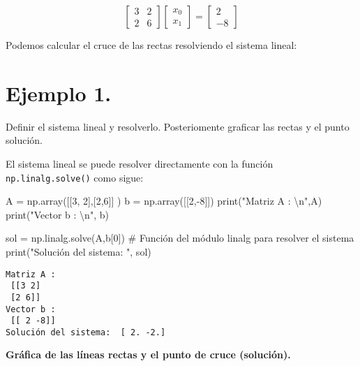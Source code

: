 \documentclass[
  letterpaper,
  DIV=11,
  numbers=noendperiod]{scrreprt}
\newenvironment{Shaded}{\begin{snugshade}}{\end{snugshade}}
\newcommand{\BuiltInTok}[1]{\textcolor[rgb]{0.00,0.23,0.31}{#1}}
\newcommand{\CharTok}[1]{\textcolor[rgb]{0.13,0.47,0.30}{#1}}
\newcommand{\CommentTok}[1]{\textcolor[rgb]{0.37,0.37,0.37}{#1}}
\newcommand{\DecValTok}[1]{\textcolor[rgb]{0.68,0.00,0.00}{#1}}
\newcommand{\NormalTok}[1]{\textcolor[rgb]{0.00,0.23,0.31}{#1}}
\newcommand{\OperatorTok}[1]{\textcolor[rgb]{0.37,0.37,0.37}{#1}}
\newcommand{\StringTok}[1]{\textcolor[rgb]{0.13,0.47,0.30}{#1}}
\begin{document}
\[
\left[
\begin{array}{cc}
3 & 2 \\
2 & 6
\end{array} \right]
\left[
\begin{array}{c}
x_{0} \\
x_{1}
\end{array} \right] =
\left[
\begin{array}{c}
2 \\ 
-8
\end{array} \right]
\tag{1}
\]

Podemos calcular el cruce de las rectas resolviendo el sistema lineal:

\section{\texorpdfstring{\textbf{Ejemplo
1.}}{Ejemplo 1.}}\label{ejemplo-1.}

Definir el sistema lineal y resolverlo. Posteriomente graficar las
rectas y el punto solución.

El sistema lineal se puede resolver directamente con la función
\texttt{np.linalg.solve()} como sigue:

\begin{Shaded}
\begin{Highlighting}[]
\NormalTok{A }\OperatorTok{=}\NormalTok{ np.array([[}\DecValTok{3}\NormalTok{, }\DecValTok{2}\NormalTok{],[}\DecValTok{2}\NormalTok{,}\DecValTok{6}\NormalTok{]] )}
\NormalTok{b }\OperatorTok{=}\NormalTok{ np.array([[}\DecValTok{2}\NormalTok{,}\OperatorTok{{-}}\DecValTok{8}\NormalTok{]])}
\BuiltInTok{print}\NormalTok{(}\StringTok{"Matriz A : }\CharTok{\textbackslash{}n}\StringTok{"}\NormalTok{,A)}
\BuiltInTok{print}\NormalTok{(}\StringTok{"Vector b : }\CharTok{\textbackslash{}n}\StringTok{"}\NormalTok{, b)}

\NormalTok{sol }\OperatorTok{=}\NormalTok{ np.linalg.solve(A,b[}\DecValTok{0}\NormalTok{]) }\CommentTok{\# Función del módulo linalg para resolver el sistema}
\BuiltInTok{print}\NormalTok{(}\StringTok{"Solución del sistema: "}\NormalTok{, sol)}
\end{Highlighting}
\end{Shaded}

\begin{verbatim}
Matriz A : 
 [[3 2]
 [2 6]]
Vector b : 
 [[ 2 -8]]
Solución del sistema:  [ 2. -2.]
\end{verbatim}

\textbf{Gráfica de las líneas rectas y el punto de cruce (solución).}
\end{document}
